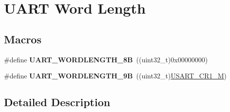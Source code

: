 \hypertarget{group___u_a_r_t___word___length}{}\section{U\+A\+RT Word Length}
\label{group___u_a_r_t___word___length}
\subsection*{Macros}
\begin{DoxyCompactItemize}
\item 
\#define {\bfseries U\+A\+R\+T\+\_\+\+W\+O\+R\+D\+L\+E\+N\+G\+T\+H\+\_\+8B}~((uint32\+\_\+t)0x00000000)\hypertarget{group___u_a_r_t___word___length_gaf394e9abaf17932ee89591f990fe6407}{}\label{group___u_a_r_t___word___length_gaf394e9abaf17932ee89591f990fe6407}

\item 
\#define {\bfseries U\+A\+R\+T\+\_\+\+W\+O\+R\+D\+L\+E\+N\+G\+T\+H\+\_\+9B}~((uint32\+\_\+t)\hyperlink{group___peripheral___registers___bits___definition_ga95f0288b9c6aaeca7cb6550a2e6833e2}{U\+S\+A\+R\+T\+\_\+\+C\+R1\+\_\+M})\hypertarget{group___u_a_r_t___word___length_gaf867be43de35fd3c32fe0b4dd4058f7e}{}\label{group___u_a_r_t___word___length_gaf867be43de35fd3c32fe0b4dd4058f7e}

\end{DoxyCompactItemize}


\subsection{Detailed Description}
